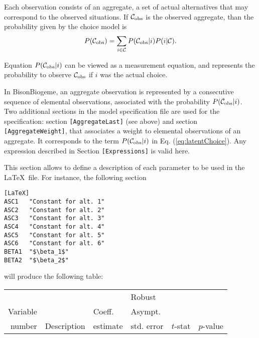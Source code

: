 \documentclass[12pt,a4paper]{article}
\newcommand{\specitem}[1]{\texttt{[#1]}}
\newcommand{\req}[1]{(\ref{#1})}
\newcommand{\C}{\mathcal{C}}
\newcommand{\BBIOGEME}{BisonBiogeme}
\begin{document}
\begin{description}
Each observation consists of an aggregate, a set of actual
alternatives that may correspond to the observed situations.  If $\C_\protect\text{obs}$ is the observed aggregate, than the
probability given by the choice model is
\begin{equation}
\label{eq:latentChoice}
P(\C_\protect\text{obs}) = \sum_{i\in \C} P(\C_\protect\text{obs}|i) P(i | \C).
\end{equation}

Equation $P(\C_\protect\text{obs}|i)$ can be viewed as a measurement equation,
and represents the probability to observe $\C_\protect\text{obs}$ if $i$ was
the actual choice. 

In \BBIOGEME , an aggregate observation is represented by a consecutive
sequence of elemental observations, associated with the probability
$P(\C_\protect\text{obs}|i)$.
Two additional sections in the model specification file are used for
the specification: section \verb+[AggregateLast]+ (see above) and
section \verb+[AggregateWeight]+, that associates a weight to
elemental observations of an aggregate. It corresponds to the term $P(\C_\protect\text{obs}|i)$ in Eq. \req{eq:latentChoice}.
 Any expression  described in Section \verb+[Expressions]+ is valid here.
\item[\specitem{LaTeX}]
This section allows to define a description of each parameter to be used in the \LaTeX\ file. For instance, the following section
\begin{verbatim}
[LaTeX]
ASC1   "Constant for alt. 1"
ASC2   "Constant for alt. 2"
ASC3   "Constant for alt. 3"
ASC4   "Constant for alt. 4"
ASC5   "Constant for alt. 5"
ASC6   "Constant for alt. 6"
BETA1  "$\beta_1$"
BETA2  "$\beta_2$"
\end{verbatim}
will produce the following table:
\begin{center}
{\small
\begin{tabular}{rlr@{.}lr@{.}lr@{.}lr@{.}l}
         &                       &   \multicolumn{2}{l}{}    & \multicolumn{2}{l}{Robust}  &     \multicolumn{4}{l}{}   \\
Variable &                       &   \multicolumn{2}{l}{Coeff.}      & \multicolumn{2}{l}{Asympt.}  &     \multicolumn{4}{l}{}   \\
number &  Description                     &   \multicolumn{2}{l}{estimate}      & \multicolumn{2}{l}{std. error}  &   \multicolumn{2}{l}{$t$-stat}  &   \multicolumn{2}{l}{$p$-value}   \\

\hline


\end{tabular}}
\end{center}
\end{description}
\end{document}
